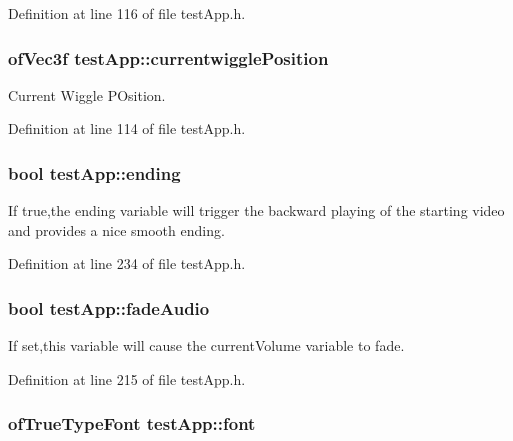 Definition at line 116 of file test\-App.\-h.

\hypertarget{classtest_app_af81358868ae15faab1974ec074b1509f}{
\subsubsection[{currentwiggle\-Position}]{\setlength{\rightskip}{0pt plus 5cm}of\-Vec3f test\-App\-::currentwiggle\-Position}}\label{classtest_app_af81358868ae15faab1974ec074b1509f}


Current Wiggle P\-Osition. 



Definition at line 114 of file test\-App.\-h.

\hypertarget{classtest_app_acf09303bc452d2a38098f6bf94655408}{
\subsubsection[{ending}]{\setlength{\rightskip}{0pt plus 5cm}bool test\-App\-::ending}}\label{classtest_app_acf09303bc452d2a38098f6bf94655408}


If true,the ending variable will trigger the backward playing of the starting video and provides a nice smooth ending. 



Definition at line 234 of file test\-App.\-h.

\hypertarget{classtest_app_a918c09b5a4389a8402cfacb25d390226}{
\subsubsection[{fade\-Audio}]{\setlength{\rightskip}{0pt plus 5cm}bool test\-App\-::fade\-Audio}}\label{classtest_app_a918c09b5a4389a8402cfacb25d390226}


If set,this variable will cause the current\-Volume variable to fade. 



Definition at line 215 of file test\-App.\-h.

\hypertarget{classtest_app_a0fdf83c29e178256ee0c1a5b9ee81653}{
\subsubsection[{font}]{\setlength{\rightskip}{0pt plus 5cm}of\-True\-Type\-Font test\-App\-::font}}\label{classtest_app_a0fdf83c29e178256ee0c1a5b9ee81653}


